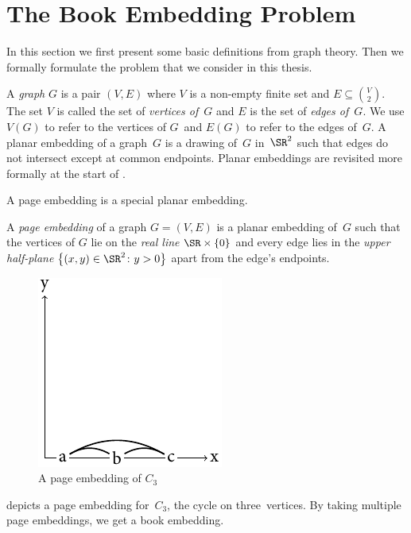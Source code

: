 \section{The Book Embedding Problem}\label{section:book-problem}

In this section we first present some basic definitions from graph theory. Then we formally formulate the problem \probBook that we consider in this thesis.

A \emph{graph} $G$ is a pair $(V, E)$ where $V$ is a non-empty finite set and
$E \subseteq \binom{V}{2}$. The set $V$ is called the set of \emph{vertices of~$G$}
and $E$ is the set of \emph{edges of~$G$}. We use $V(G)$ to refer to the vertices
of $G$~and $E(G)$ to refer to the edges of~$G$. A planar embedding of a graph~$G$ is a drawing of~$G$ in~$\SR^2$
such that edges do not intersect except at common endpoints. Planar embeddings are revisited more formally at the start of .

A page embedding is a special planar embedding.

\begin{definition}
\label{def:page-embed}
A \emph{page embedding} of a graph $G = (V, E)$ is a planar embedding of~$G$ such that
the vertices of $G$ lie on the \emph{real line} $\SR \times \{0\}$ and every edge lies in the \emph{upper half-plane} $\bigl\{(x, y) \in \SR^2\colon y > 0\bigr\}$ apart from the edge's endpoints.
\end{definition}

\begin{figure}[\placement]
	\centering
	\includegraphics{figures/t_page_c3}
	\caption[Page embedding of $C_3$]{A page embedding of $C_3$}
	\label{figure:page-c3}
\end{figure}

 depicts a page embedding for~$C_3$, the cycle on three~vertices.
By taking multiple page embeddings, we get a book embedding. 

